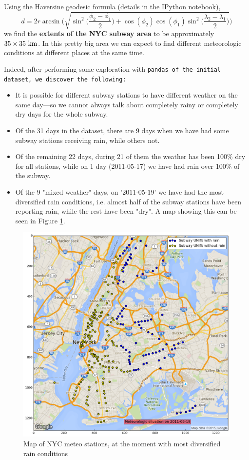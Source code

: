 \documentclass{article}
\begin{document}
Using the Haversine geodesic formula (details in the IPython notebook), 
$$d = 2 r \arcsin \Bigg( \sqrt{ \sin^2 \bigg(\frac{\phi_2 - \phi_1} {2} \bigg) + \cos( \phi_2)\cos(\phi_1)\sin^2\bigg(\frac{\lambda_2 - \lambda_1} {2} \bigg) }\Bigg)$$
we find the \textbf{extents of the NYC subway area} to be approximately $35 \times 35 \ \rm km$. In this pretty big area we can expect to find different meteorologic conditions at different places at the same time.

Indeed, after performing some exploration with \tt pandas \rm of the initial dataset, we discover the following:
\begin{itemize}
\item It is possible for different subway stations to have different weather on the same day---so we cannot always talk about completely rainy or completely dry days for the whole subway.
\item Of the 31 days in the dataset, there are 9 days when we have had some subway stations receiving rain, while others not.
\item Of the remaining 22 days, during 21 of them the weather has been 100\% dry for all stations, while on 1 day (2011-05-17) we have had rain over 100\% of the subway.
\item Of the 9 "mixed weather" days, on '2011-05-19' we have had the most diversified rain conditions, i.e. almost half of the subway stations have been reporting rain, while the rest have been "dry". A map showing this can be seen in Figure \ref{fig:most-diverse-rain-conditions}.
\end{itemize}


\begin{figure}[ht]
\centering
\includegraphics[scale=0.6]{map_half_rain_half_norain.png}
\caption{Map of NYC meteo stations, at the moment with most diversified rain conditions}
\label{fig:most-diverse-rain-conditions}
\end{figure}
\end{document}
